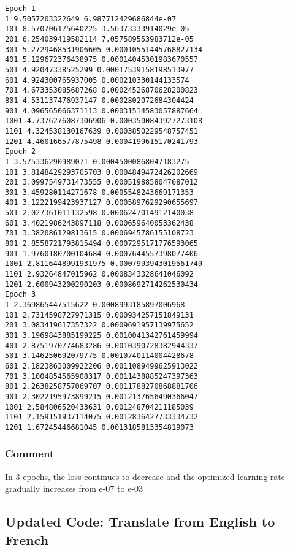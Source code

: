 \documentclass[11pt]{article}
\begin{document}
    \begin{Verbatim}[commandchars=\\\{\}]
Epoch 1
1 9.5057203322649 6.987712429686844e-07
101 8.570706175640225 3.56373333914029e-05
201 6.254039419582114 7.057589553983712e-05
301 5.2729468531906605 0.00010551445768827134
401 5.129672376438975 0.00014045301983670557
501 4.92047338525299 0.00017539158198513977
601 4.924300765937005 0.000210330144133574
701 4.673353085687268 0.00024526870628200823
801 4.531137476937147 0.0002802072684304424
901 4.096565066371113 0.00031514583057887664
1001 4.7376276087306906 0.0003500843927273108
1101 4.324538130167639 0.0003850229548757451
1201 4.460166577875498 0.0004199615170241793
Epoch 2
1 3.575336290989071 0.00045000868047183275
101 3.8148429293705703 0.0004849472426202669
201 3.0997549731473555 0.0005198858047687012
301 3.459280114271678 0.0005548243669171353
401 3.1222199423937127 0.0005897629290655697
501 2.027361011132598 0.0006247014912140038
601 3.4021986243897118 0.000659640053362438
701 3.382086129813615 0.0006945786155108723
801 2.8558721793815494 0.0007295171776593065
901 1.9760180700104684 0.0007644557398077406
1001 2.8116448991931975 0.0007993943019561749
1101 2.93264847015962 0.0008343328641046092
1201 2.600943200290203 0.0008692714262530434
Epoch 3
1 2.369865447515622 0.0008993185897006968
101 2.7314598727971315 0.000934257151849131
201 3.083419617357322 0.0009691957139975652
301 3.1969843885199225 0.0010041342761459994
401 2.8751970774683286 0.0010390728382944337
501 3.146250692079775 0.0010740114004428678
601 2.1823863009922206 0.0011089499625913022
701 3.1004854565908317 0.0011438885247397363
801 2.2638258757069707 0.0011788270868881706
901 2.3022195973899215 0.0012137656490366047
1001 2.584806520433631 0.001248704211185039
1101 2.159151937114075 0.0012836427733334732
1201 1.67245446681045 0.0013185813354819073

    \end{Verbatim}

    \hypertarget{comment}{%
\subsubsection{Comment}\label{comment}}

In 3 epochs, the loss continues to decrease and the optimized learning
rate gradually increases from e-07 to e-03

    \hypertarget{updated-code-translate-from-english-to-french}{%
\subsection{Updated Code: Translate from English to
French}\label{updated-code-translate-from-english-to-french}}
\end{document}
